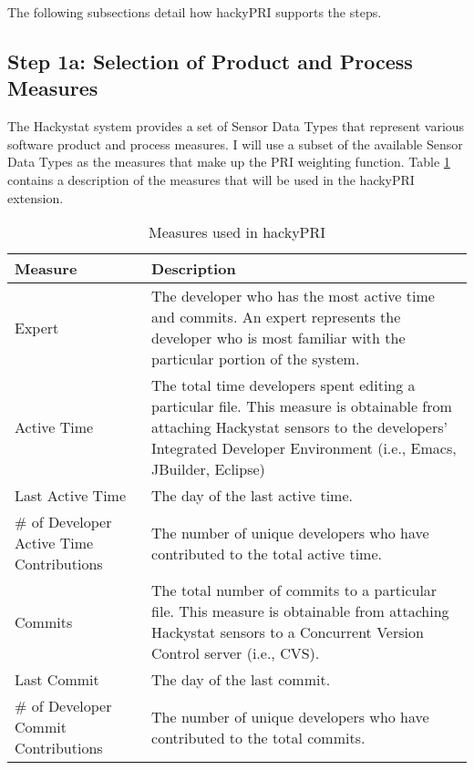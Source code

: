 The following subsections detail how hackyPRI supports the steps.

\subsection{Step 1a: Selection of Product and Process Measures}
The Hackystat system provides a set of Sensor Data Types that represent
various software product and process measures. I will use a subset of the
available Sensor Data Types as the measures that make up the PRI weighting
function. Table \ref{table:measures-hackyPRI} contains a description of the
measures that will be used in the hackyPRI extension.

\begin{table}[htbp]
  \begin{center}
    \caption{Measures used in hackyPRI}
    \label{table:measures-hackyPRI}
    \begin{tabular}{|p{3.0cm}|p{10.0cm}|} \hline
      {\bf Measure} & {\bf Description} \\ \hline
\small{}Expert & \small{}The developer who has the most active time and
commits. An expert represents the developer who is most familiar with the
particular portion of the system. \\ \hline

\small{}Active Time & \small{}The total time developers spent editing a
particular file. This measure is obtainable from attaching Hackystat
sensors to the developers' Integrated Developer Environment (i.e., Emacs,
JBuilder, Eclipse) \\ \hline
\small{}Last Active Time & \small{}The day of the last active time. \\ \hline
\small{}\# of Developer \newline Active Time \newline Contributions &
\small{}The number of unique developers who have contributed to the total
active time. \\ \hline

\small{}Commits & \small{}The total number of commits to a particular
file. This measure is obtainable from attaching Hackystat sensors to a
Concurrent Version Control server (i.e., CVS). \\ \hline
\small{}Last Commit & \small{}The day of the last commit. \\ \hline
\small{}\# of Developer \newline Commit \newline Contributions &
\small{}The number of unique developers who have contributed to the total
commits. \\ \hline


\end{tabular}
\end{center}
\end{table}
